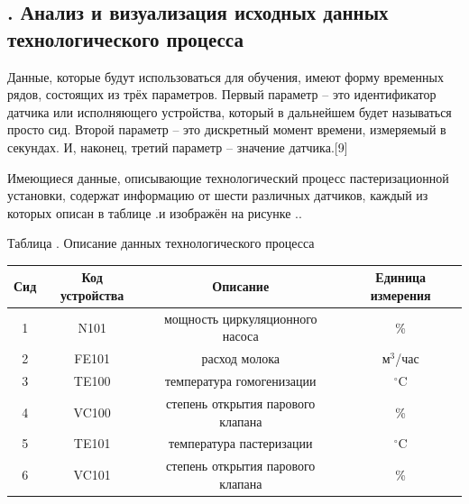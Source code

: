 \setcounter{chaptercntr}{3}


\titlespace

\subsection*{ 
  \gostTitleFont
  \redline
  \thechaptercntr .\thesubchaptercntr \spc
  Анализ и визуализация исходных данных технологического процесса
} \addtocounter{subchaptercntr}{1}

\subtitlespace

{\gostFont

  \par \redline Данные, которые будут использоваться для обучения, имеют форму временных рядов, состоящих из трёх параметров. Первый параметр {--} это идентификатор датчика или исполняющего устройства, который в дальнейшем будет называться просто сид. Второй параметр {--} это дискретный момент времени, измеряемый в секундах. И, наконец, третий параметр {--} значение датчика.[9] 

  \par \redline Имеющиеся данные, описывающие технологический процесс пастеризационной установки, содержат информацию от шести различных датчиков, каждый из которых описан в таблице \thechaptercntr .\thetablecntr \spc и изображён на рисунке \thechaptercntr .\theimagecntr .

	\topTablespace
	{\begin{Center}
		\par Таблица \thechaptercntr .\thetablecntr \spc {--} Описание данных технологического процесса

	\begin{tabular}{|c|c|c|c|}
		\hline
	  Сид & Код устройства & Описание & Единица измерения \\ \hline
		1 & N101 & мощность циркуляционного насоса & \% \\ \hline
		2 & FE101 & расход молока & м$^3$/час \\ \hline
		3 & TE100 & температура гомогенизации & $^\circ$C \\ \hline
		4 & VC100 & степень открытия парового клапана & \% \\ \hline
		5 & TE101 & температура пастеризации & $^\circ$C \\ \hline
		6 & VC101 & степень открытия парового клапана & \% \\ \hline
	\end{tabular} \end{Center}} 
	\botTablespace

}
